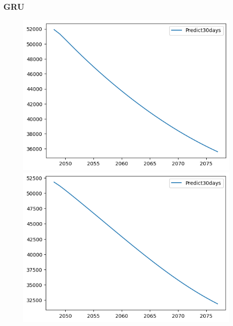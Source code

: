 \subsubsection{GRU}
\begin{figure}[H]
    \centering
    \begin{minipage}{0.15\textwidth}
    \centering
    \includegraphics[width=1\textwidth]{resources/chapter-5/predicted/BIDV_GRU_7-3_30days.png}
    \end{minipage}
    \hfill
    \begin{minipage}{0.15\textwidth}
    \centering
    \includegraphics[width=1\textwidth]{resources/chapter-5/predicted/BIDV_GRU_8-2_30days.png}
    \end{minipage}
    \hfill
        \begin{minipage}{0.15\textwidth}

\end{minipage}
\end{figure}
